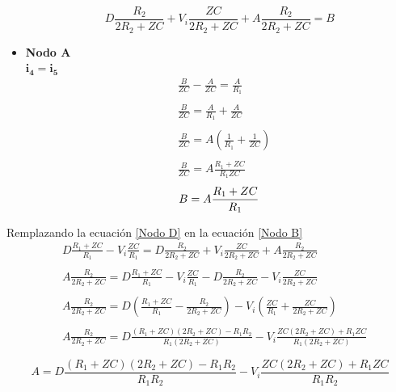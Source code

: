\begin{itemize}
\begin{equation}
            D\frac{R_{2}}{2R_{2}+ZC}  + V_{i}\frac{ZC}{2R_{2}+ZC} + A\frac{R_{2}}{2R_{2}+ZC} = B
        \end{equation}
        \item \textbf{Nodo A} \\
        $ \mathbf{i_{4}=i_{5}}$
        \begin{align*}
            &\frac{B}{ZC} - \frac{A}{ZC} = \frac{A}{R_{1}}\\\\
            &\frac{B}{ZC} = \frac{A}{R_{1}} + \frac{A}{ZC}\\\\
            &\frac{B}{ZC} = A(\frac{1}{R_{1}} + \frac{1}{ZC})\\\\
            &\frac{B}{ZC} = A\frac{R_{1}+ZC}{R_{1}ZC}
        \end{align*}
        \begin{equation}\label{Nodo A}
            B= A\frac{R_{1}+ZC}{R_{1}} \\\\
        \end{equation}
\end{itemize}
    
    Remplazando la ecuación \ref{Nodo D} en la ecuación \ref{Nodo B}
    \begin{align*}
        &D\frac{R_{1}+ZC}{R_{1}} - V_{i}\frac{ZC}{R_{1}} = D\frac{R_{2}}{2R_{2}+ZC}  + V_{i}\frac{ZC}{2R_{2}+ZC} + A\frac{R_{2}}{2R_{2}+ZC} \\\\
        &A\frac{R_{2}}{2R_{2}+ZC} = D\frac{R_{1}+ZC}{R_{1}} - V_{i}\frac{ZC}{R_{1}} - D\frac{R_{2}}{2R_{2}+ZC} - V_{i}\frac{ZC}{2R_{2}+ZC}  \\\\
        &A\frac{R_{2}}{2R_{2}+ZC} = D(\frac{R_{1}+ZC}{R_{1}} - \frac{R_{2}}{2R_{2}+ZC}) - V_{i}(\frac{ZC}{R_{1}}  + \frac{ZC}{2R_{2}+ZC}) \\\\
        &A\frac{R_{2}}{2R_{2}+ZC} = D\frac{(R_{1}+ZC)(2R_{2}+ZC)-R_{1}R_{2}}{R_{1}(2R_{2}+ZC)} - V_{i}\frac{ZC(2R_{2}+ZC)+ R_{1}ZC}{R_{1}(2R_{2}+ZC)} \\\\
    \end{align*}
    \begin{equation}\label{Nodo D en B}
        A = D\frac{ (R_{1}+ZC)(2R_{2}+ZC)-R_{1}R_{2} }{ R_{1}R_{2}} - V_{i}\frac{ ZC(2R_{2}+ZC)+ R_{1}ZC }{ R_{1}R_{2}}
    \end{equation}
    
